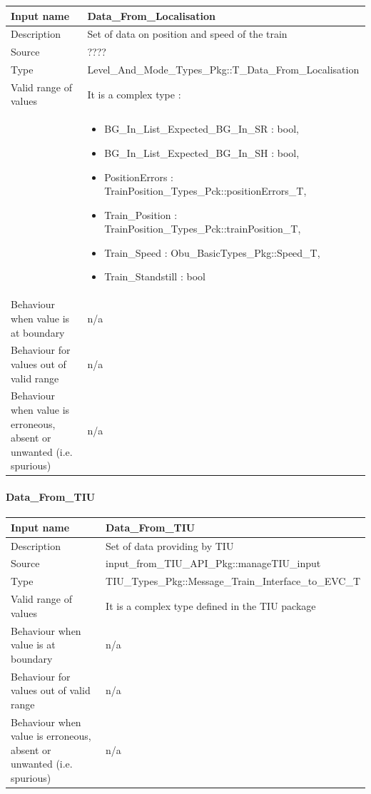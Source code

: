 \begin{longtable}{p{}p{}}
\toprule
Input name				& Data\_From\_Localisation \\
\midrule
Description				& Set of data on position and speed of the train \\
\midrule
Source					& ???? \todo[inline]{to be completed} \\ 
\midrule
Type					& Level\_And\_Mode\_Types\_Pkg::T\_Data\_From\_Localisation \\
\midrule
Valid range of values	& It is a complex type : \\
& \begin{itemize}
\item BG\_In\_List\_Expected\_BG\_In\_SR : bool,
\item  BG\_In\_List\_Expected\_BG\_In\_SH : bool, 
\item PositionErrors : TrainPosition\_Types\_Pck::positionErrors\_T,
\item  Train\_Position : TrainPosition\_Types\_Pck::trainPosition\_T,
\item Train\_Speed : Obu\_BasicTypes\_Pkg::Speed\_T, 
\item Train\_Standstill : bool
\end{itemize} \\
\midrule
Behaviour when value is at boundary	& n/a \\ 
\midrule
Behaviour for values out of valid range	& n/a \\ 
\midrule
Behaviour when value is erroneous, absent or unwanted (i.e. spurious) & n/a \\ 
\bottomrule
\end{longtable}

\paragraph{Data\_From\_TIU}

\begin{longtable}{p{}p{}}
\toprule
Input name				& Data\_From\_TIU \\
\midrule
Description				& Set of data providing by TIU \\
\midrule
Source					& input\_from\_TIU\_API\_Pkg::manageTIU\_input \\ 
\midrule
Type					& TIU\_Types\_Pkg::Message\_Train\_Interface\_to\_EVC\_T \\
\midrule
Valid range of values	& It is a complex type defined in the TIU package \\
\midrule
Behaviour when value is at boundary	& n/a \\ 
\midrule
Behaviour for values out of valid range	& n/a \\ 
\midrule
Behaviour when value is erroneous, absent or unwanted (i.e. spurious) & n/a \\ 
\bottomrule
\end{longtable}


